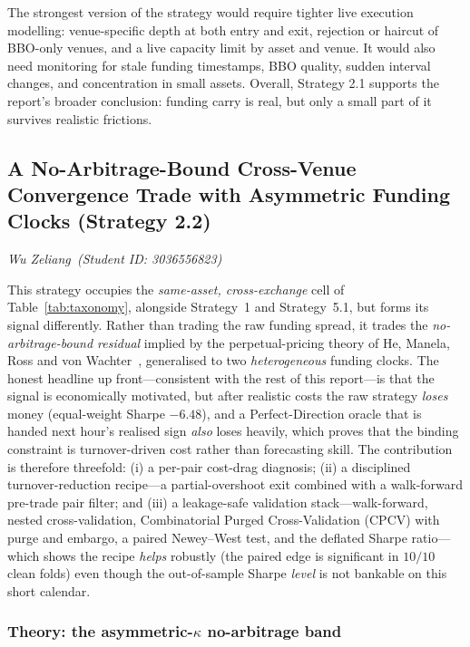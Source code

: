 \documentclass[10pt,twocolumn,a4paper]{article}
\begin{document}
The strongest version of the strategy would require tighter live execution modelling: venue-specific depth at both entry and exit, rejection or haircut of BBO-only venues, and a live capacity limit by asset and venue. It would also need monitoring for stale funding timestamps, BBO quality, sudden interval changes, and concentration in small assets. Overall, Strategy 2.1 supports the report's broader conclusion: funding carry is real, but only a small part of it survives realistic frictions.

\clearpage
\subsection{A No-Arbitrage-Bound Cross-Venue Convergence Trade with Asymmetric Funding Clocks (Strategy 2.2)}
\begingroup\par\vspace{-2pt}%
{\small\itshape Wu Zeliang\ (Student ID: 3036556823)}\par\vspace{4pt}\endgroup

This strategy occupies the \emph{same-asset, cross-exchange} cell of Table~\ref{tab:taxonomy}, alongside Strategy~1 and Strategy~5.1, but forms its signal differently. Rather than trading the raw funding spread, it trades the \emph{no-arbitrage-bound residual} implied by the perpetual-pricing theory of He, Manela, Ross and von Wachter~\cite{he2022perpetual}, generalised to two \emph{heterogeneous} funding clocks. The honest headline up front---consistent with the rest of this report---is that the signal is economically motivated, but after realistic costs the raw strategy \emph{loses} money (equal-weight Sharpe $-6.48$), and a Perfect-Direction oracle that is handed next hour's realised sign \emph{also} loses heavily, which proves that the binding constraint is turnover-driven cost rather than forecasting skill. The contribution is therefore threefold: (i) a per-pair cost-drag diagnosis; (ii) a disciplined turnover-reduction recipe---a partial-overshoot exit combined with a walk-forward pre-trade pair filter; and (iii) a leakage-safe validation stack---walk-forward, nested cross-validation, Combinatorial Purged Cross-Validation (CPCV) with purge and embargo, a paired Newey--West test, and the deflated Sharpe ratio---which shows the recipe \emph{helps} robustly (the paired edge is significant in $10/10$ clean folds) even though the out-of-sample Sharpe \emph{level} is not bankable on this short calendar.

\subsubsection{Theory: the asymmetric-$\kappa$ no-arbitrage band}
\end{document}

